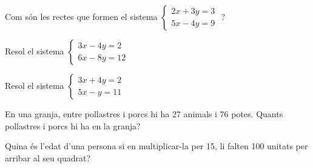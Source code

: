 \begin{autoaval}{40}
\begin{mylist}
\exer[2] Com són les rectes que formen el sistema $\left\{\begin{array}{c} {2x+3y=3} \\ {5x-4y=9} \end{array}\right. $ ?

\exer[2] Resol el sistema $\left\{\begin{array}{c} {3x-4y=2} \\ {6x-8y=12} \end{array}\right. $ 

\exer[2] Resol el sistema $\left\{\begin{array}{c} {3x+4y=2} \\ {5x-y=11} \end{array}\right. $

\exer[2] En una granja, entre pollastres i porcs hi ha 27 animals i 76 potes. Quants pollastres i porcs hi ha en la granja?

\exer[2] Quina és l'edat d'una persona si en multiplicar-la per 15, li falten 100 unitats per arribar al seu quadrat?

 
\end{mylist}
\end{autoaval}


